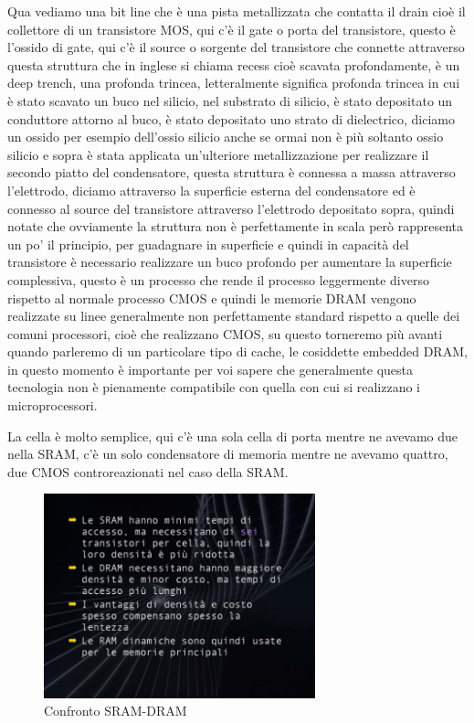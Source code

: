 Qua vediamo una bit line che è una pista metallizzata che contatta il drain cioè il collettore di un transistore MOS, qui c'è il gate o porta del transistore, questo è l'ossido di gate, qui c'è il source o sorgente del transistore che connette attraverso questa struttura che in inglese si chiama recess cioè scavata profondamente, è un deep trench, una profonda trincea, letteralmente significa profonda trincea in cui è stato scavato un buco nel silicio, nel substrato di silicio, è stato depositato un conduttore attorno al buco, è stato depositato uno strato di dielectrico, diciamo un ossido per esempio dell'ossio silicio anche se ormai non è più soltanto ossio silicio e sopra è stata applicata un'ulteriore metallizzazione per realizzare il secondo piatto del condensatore, questa struttura è connessa a massa attraverso l'elettrodo, diciamo attraverso la superficie esterna del condensatore ed è connesso al source del transistore attraverso l'elettrodo depositato sopra, quindi notate che ovviamente la struttura non è perfettamente in scala però rappresenta un po' il principio, per guadagnare in superficie e quindi in capacità del transistore è necessario realizzare un buco profondo per aumentare la superficie complessiva, questo è un processo che rende il processo leggermente diverso rispetto al normale processo CMOS e quindi le memorie DRAM vengono realizzate su linee generalmente non perfettamente standard rispetto a quelle dei comuni processori, cioè che realizzano CMOS, su questo torneremo più avanti quando parleremo di un particolare tipo di cache, le cosiddette embedded DRAM, in questo momento è importante per voi sapere che generalmente questa tecnologia non è pienamente compatibile con quella con cui si realizzano i microprocessori.

La cella è molto semplice, qui c'è una sola cella di porta mentre ne avevamo due nella SRAM, c'è un solo condensatore di memoria mentre ne avevamo quattro, due CMOS controreazionati nel caso della SRAM.

\FloatBarrier
\begin{figure}[H]
  \centering
  \includegraphics[width=0.70\textwidth,
                    trim=0 0 0 0, %
                    clip]
                    {images/Lez04_p04_fig_02.png}
  \caption{Confronto SRAM-DRAM}
  \label{fig:Lez04_p04_fig_02}
\end{figure}
\FloatBarrier
\noindent



